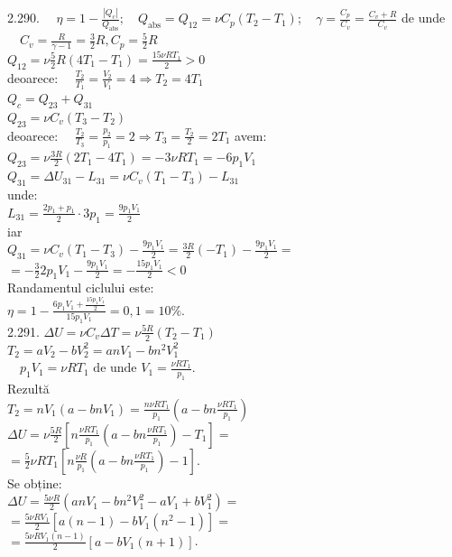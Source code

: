2.290. $\quad \eta=1-\frac{\left|Q_{c}\right|}{Q_{\text{abs}}} ; \quad Q_{\text{abs}}=Q_{12}=\nu C_{p}\left(T_{2}-T_{1}\right) ; \quad \gamma=\frac{C_{p}}{C_{v}}=\frac{C_{v}+R}{C_{v}}$ de unde $\quad C_{v}=\frac{R}{\gamma-1}=\frac{3}{2} R, C_{p}=\frac{5}{2} R$\\ $Q_{12}=\nu \frac{5}{2} R\left(4 T_{1}-T_{1}\right)=\frac{15 \nu R T_{1}}{2}>0$\\ deoarece: $\quad \frac{T_{2}}{T_{1}}=\frac{V_{2}}{V_{1}}=4 \Rightarrow T_{2}=4 T_{1}$\\ $Q_{c}=Q_{23}+Q_{31}$\\ $Q_{23}=\nu C_{v}\left(T_{3}-T_{2}\right)$\\ deoarece: $\quad \frac{T_{2}}{T_{3}}=\frac{p_{2}}{p_{1}}=2 \Rightarrow T_{3}=\frac{T_{2}}{2}=2 T_{1}$ avem:\\ $Q_{23}=\nu \frac{3 R}{2}\left(2 T_{1}-4 T_{1}\right)=-3 \nu R T_{1}=-6 p_{1} V_{1}$\\ $Q_{31}=\Delta U_{31}-L_{31}=\nu C_{v}\left(T_{1}-T_{3}\right)-L_{31}$\\ unde:\\ $L_{31}=\frac{2 p_{1}+p_{1}}{2} \cdot 3 p_{1}=\frac{9 p_{1} V_{1}}{2}$\\ iar\\ $Q_{31} =\nu C_{v}\left(T_{1}-T_{3}\right)-\frac{9 p_{1} V_{1}}{2}=\frac{3 R}{2}\left(-T_{1}\right)-\frac{9 p_{1} V_{1}}{2}= $\\ $=-\frac{3}{2} 2 p_{1} V_{1}-\frac{9 p_{1} V_{1}}{2}=-\frac{15 p_{1} V_{1}}{2}<0$\\ Randamentul ciclului este:\\ $\eta=1-\frac{6 p_{1} V_{1}+\frac{15 p_{1} V_{1}}{2}}{15 p_{1} V_{1}}=0,1=10 \%$.\\

2.291. $\Delta U=\nu C_{v} \Delta T=\nu \frac{5 R}{2}\left(T_{2}-T_{1}\right)$\\ $T_{2}=a V_{2}-b V_{2}^{2}=a n V_{1}-b n^{2} V_{1}^{2}$\\ $\quad p_{1} V_{1}=\nu R T_{1} \text { de unde } V_{1}=\frac{\nu R T_{1}}{p_{1}}$.\\ Rezultă\\ $T_{2}=n V_{1}\left(a-b n V_{1}\right)=\frac{n \nu R T_{1}}{p_{1}}\left(a-b n \frac{\nu R T_{1}}{p_{1}}\right)$\\ $\Delta U =\nu \frac{5 R}{2}\left[n \frac{\nu R T_{1}}{p_{1}}\left(a-b n \frac{\nu R T_{1}}{p_{1}}\right)-T_{1}\right]=$\\ $=\frac{5}{2} \nu R T_{1}\left[n \frac{\nu R}{p_{1}}\left(a-b n \frac{\nu R T_{1}}{p_{1}}\right)-1\right]$.\\ Se obține:\\ $\Delta U =\frac{5 \nu R}{2}\left(a n V_{1}-b n^{2} V_{1}^{2}-a V_{1}+b V_{1}^{2}\right)=$\\ $=\frac{5 \nu R V_{1}}{2}\left[a(n-1)-b V_{1}\left(n^{2}-1\right)\right]=$\\ $=\frac{5 \nu R V_{1}(n-1)}{2}\left[a-b V_{1}(n+1)\right]$.\\

